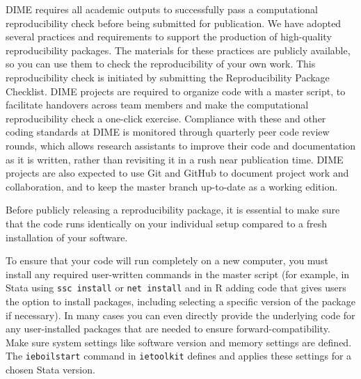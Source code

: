 DIME requires all academic outputs to successfully pass a computational reproducibility check
before being submitted for publication.
We have adopted several practices and requirements to support the production
of high-quality reproducibility packages.
The materials for these practices are publicly available,
so you can use them to check the reproducibility of your own work.
This reproducibility check is initiated by submitting the Reproducibility Package Checklist.
DIME projects are required to organize code
with a master script, to facilitate handovers across team members
and make the computational reproducibility check a one-click exercise.
Compliance with these and other coding standards at DIME is monitored through
quarterly peer code review rounds, which allows research assistants to improve their code and documentation as it is written,
rather than revisiting it in a rush near publication time.
DIME projects are also expected to use Git and GitHub
to document project work and collaboration,
and to keep the master branch up-to-date as a working edition.

Before publicly releasing a reproducibility package,
it is essential to make sure that the code runs identically
on your individual setup compared to
a fresh installation of your software.

To ensure that your code will run completely on a new computer,
you must install any required user-written commands in the master script
(for example, in Stata using \texttt{ssc install} or \texttt{net install}
and in R adding code that gives users the option to install packages,
including selecting a specific version of the package if necessary).
In many cases you can even directly provide the underlying code
for any user-installed packages that are needed to ensure forward-compatibility.
Make sure system settings like software version and memory settings are defined.
The \texttt{ieboilstart} command in \texttt{ietoolkit} defines and applies these settings
for a chosen Stata version.

